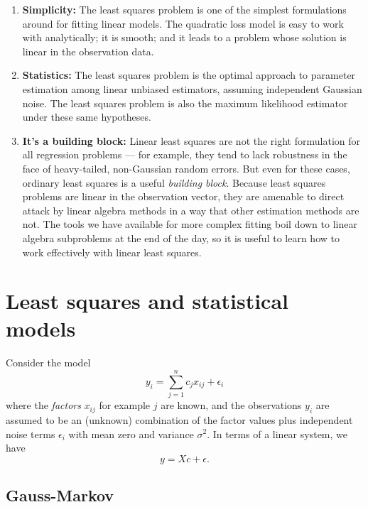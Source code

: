 \documentclass[12pt, leqno]{article} %
\begin{document}
\begin{enumerate}
  \item {\bf Simplicity:}
  The least squares problem is one of the simplest formulations
  around for fitting linear models.  The quadratic loss model
  is easy to work with analytically; it is smooth; and it leads
  to a problem whose solution is linear in the observation data.

  \item {\bf Statistics:}
  The least squares problem is the optimal approach to parameter
  estimation among linear unbiased estimators, assuming independent
  Gaussian noise.  The least squares problem is also the maximum likelihood
  estimator under these same hypotheses.

  \item {\bf It's a building block:}
  Linear least squares are not the right formulation for all regression
  problems --- for example, they tend to lack robustness in the face of
  heavy-tailed, non-Gaussian random errors.  But even for these cases,
  ordinary least squares is a useful {\em building block}.
  Because least squares problems are linear in the observation vector,
  they are amenable to direct attack by linear algebra methods in a way
  that other estimation methods are not.  The tools we
  have available for more complex fitting boil down to linear algebra
  subproblems at the end of the day, so it is useful to learn how to work
  effectively with linear least squares.
\end{enumerate}

\section{Least squares and statistical models}

Consider the model
\[
  y_i = \sum_{j=1}^n c_j x_{ij} + \epsilon_i
\]
where the {\em factors} $x_{ij}$ for example $j$ are known,
and the observations $y_i$ are assumed to be an (unknown)
combination of the factor values plus independent noise
terms $\epsilon_i$ with mean zero and variance $\sigma^2$.
In terms of a linear system, we have
\[
  y = X c + \epsilon.
\]

\subsection{Gauss-Markov}
\end{document}
